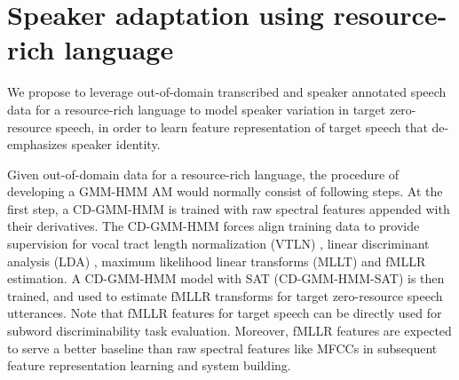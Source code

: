 \documentclass[a4paper]{article}
\begin{document}

\section{Speaker adaptation using resource-rich language}
\label{sec:SAT}
We propose to leverage out-of-domain transcribed and speaker annotated speech data for a resource-rich language to model speaker variation in target zero-resource speech, in order to learn feature representation of target speech that de-emphasizes speaker identity.

Given out-of-domain data for a resource-rich language, the procedure of developing a GMM-HMM AM would normally consist of following steps. At the first step, a CD-GMM-HMM is trained with raw spectral features appended with their derivatives.
The CD-GMM-HMM forces align training data to provide  supervision for vocal tract length normalization (VTLN) \cite{kim2004using}, linear discriminant analysis (LDA) \cite{haeb1992linear}, maximum likelihood linear transforms (MLLT) \cite{gales1999semi} and fMLLR \cite{povey2012basis} estimation. A CD-GMM-HMM model with SAT (CD-GMM-HMM-SAT) is then trained, and used to 
estimate fMLLR transforms for target zero-resource speech utterances. Note that fMLLR features for target speech can be directly used for subword discriminability task evaluation. Moreover,
fMLLR features are expected to  serve a better baseline than raw spectral features like MFCCs in subsequent feature representation learning and system building.
\end{document}
